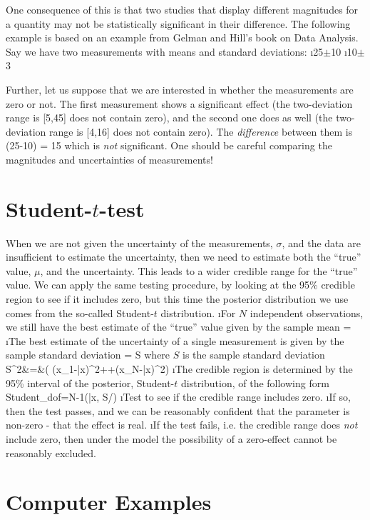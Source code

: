 One consequence of this is that two studies that display different magnitudes for a quantity may not be statistically significant in their difference.  The following example is based on an example from Gelman and Hill's book on Data Analysis.\cite{gelman2007data} Say we have two measurements with means and standard deviations:
\bi
\i 25$\pm$10
\i 10$\pm$3
\ei

Further, let us suppose that we are interested in whether the measurements are zero or not.  The first measurement shows a significant effect (the two-deviation range is [5,45] does not contain zero), and the second one does as well (the two-deviation range is [4,16] does not contain zero).  The {\em difference} between them is 
\beqn
(25-10) \pm {} = 15
\eeqn
which is {\em not} significant.  One should be careful comparing the magnitudes and uncertainties of measurements!

\section{Student-$t$-test}\label{sec:ttest}

When we are not given the uncertainty of the measurements, $\sigma$, and the data are insufficient to estimate the uncertainty, then we need to estimate both the ``true'' value, $\mu$, and the uncertainty.  This leads to a wider credible range for the ``true'' value.  We can apply the same testing procedure, by looking at the 95\% credible region to see if it includes zero, but this time the posterior distribution we use comes from the so-called Student-$t$ distribution.
\be
\i  For $N$ independent observations, we still have the best estimate of the ``true'' value given by the sample mean
\beqn
\hat{\mu} = 
\eeqn
\i The best estimate of the uncertainty of a single measurement is given by the sample standard deviation
\beqn
\hat{\sigma} = S 
\eeqn
where $S$ is the sample standard deviation
\beqn
S^{2}&=&\left( (x_{1}-\bar{x})^{2}+\cdots+(x_{N}-\bar{x})^{2}\right) 
\eeqn
\i The credible region is determined by the 95\% interval of the posterior, Student-$t$ distribution, of the following form
\beqn
{\rm Student}_{{\rm dof}=N-1}(\bar{x}, S/)
\eeqn
\i Test to see if the credible range includes zero. 
\i If so, then the test passes, and we can be reasonably confident that the parameter is non-zero - that the effect is real. 
\i If the test fails, i.e. the credible range does \emph{not} include zero, then under the model the possibility of a zero-effect cannot be reasonably excluded.
\ee



\section{Computer Examples}
\begin{fullwidth}

\end{fullwidth}